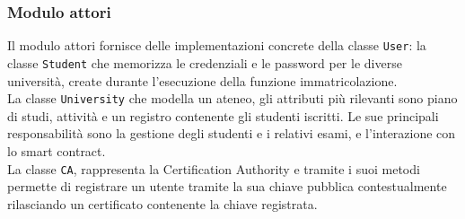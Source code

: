 \documentclass[a4paper,12pt]{article}
\begin{document}
\subsubsection{Modulo attori}
Il modulo attori fornisce delle implementazioni concrete della classe \texttt{User}: 
la classe \texttt{Student} che memorizza le credenziali e le password per le diverse università, create durante l'esecuzione della funzione immatricolazione. 
\\[1em]
La classe \texttt{University} che modella un ateneo, gli attributi più rilevanti sono piano di studi, attività e un registro contenente gli studenti iscritti. 
Le sue principali responsabilità sono la gestione degli studenti e i relativi esami, e l'interazione con lo smart contract. 
\\[1em]
La classe \texttt{CA}, rappresenta la Certification Authority e tramite i suoi metodi permette di registrare un utente tramite la sua chiave pubblica contestualmente rilasciando un certificato contenente la chiave registrata.
\end{document}
